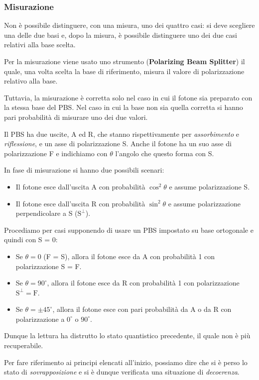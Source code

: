 \subsubsection{Misurazione}
Non \`e possibile distinguere, con una misura, uno dei quattro casi: si deve scegliere una delle due basi e, dopo la
misura, \`e possibile distinguere uno dei due casi relativi alla base scelta.

Per la misurazione viene usato uno strumento (\textbf{Polarizing Beam Splitter}) il quale, una volta scelta la base di
riferimento, misura il valore di polarizzazione relativo alla base.

Tuttavia, la misurazione \`e corretta solo nel caso in cui il fotone sia preparato con la stessa base del PBS. Nel caso
in cui la base non sia quella corretta si hanno pari probabilit\`a di misurare uno dei due valori.

Il PBS ha due uscite, A ed R, che stanno rispettivamente per \emph{assorbimento} e \emph{riflessione}, e un asse di
polarizzazione S. Anche il fotone ha un suo asse di polarizzazione F e indichiamo con $\theta$ l'angolo che questo
forma con S.

In fase di misurazione si hanno due possibili scenari:
\begin{itemize}
	\item Il fotone esce dall'uscita A con probabilit\`a $\cos^2 \theta$ e assume polarizzazione S.
	\item Il fotone esce dall'uscita R con probabilit\`a $\sin^2 \theta$ e assume polarizzazione perpendicolare a S
	      ($\text{S}^\perp$).
\end{itemize}
Procediamo per casi supponendo di usare un PBS impostato su base ortogonale e quindi con S = 0:
\begin{itemize}
	\item Se $\theta = 0$ (F = S), allora il fotone esce da A con probabilit\`a 1 con polarizzazione S = F.
	\item Se $\theta = 90^\circ$, allora il fotone esce da R con probabilit\`a 1 con polarizzazione
	      $\text{S}^\perp = \text{F}$.
	\item Se $\theta = \pm 45^\circ$, allora il fotone esce con pari probabilit\`a da A o da R con polarizzazione
	      a $0^\circ$ o $90^\circ$.
\end{itemize}
Dunque la lettura ha distrutto lo stato quantistico precedente, il quale non \`e pi\`u recuperabile.

Per fare riferimento ai principi elencati all'inizio, possiamo dire che si \`e perso lo stato di \emph{sovrapposizione}
e si \`e dunque verificata una situazione di \emph{decoerenza}.

